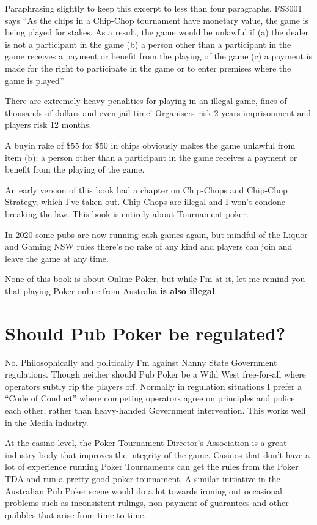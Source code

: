 Paraphrasing slightly to keep this excerpt to less than four paragraphs,
FS3001 says ``As the chips in a Chip-Chop tournament
have monetary value, the game is being played for stakes. As a result,
the game would be unlawful if (a) the dealer is not a participant in the game
(b) a person other than a participant in the game receives a payment
or benefit from the playing of the game (c) a payment is made for the
right to participate in the game or to enter premises where the game
is played''

There are extremely heavy penalities for playing in an illegal game,
fines of thousands of dollars and even jail time!
Organisers risk 2 years imprisonment and players risk 12 months.

A buyin rake of \$55 for \$50 in chips obviously
makes the game unlawful from item (b): a person other than a
participant in the game receives a payment or benefit from the playing
of the game.

An early version of this book had a chapter on Chip-Chops and
Chip-Chop Strategy, which I've taken out. Chip-Chops are illegal and I
won't condone breaking the law. This book is entirely about
Tournament poker.

In 2020 some pubs are now running cash games again, but mindful
of the Liquor and Gaming NSW rules there's no rake of any kind and
players can join and leave the game at any time.

None of this book is about Online Poker, but while I'm at it,
let me remind you that playing Poker online from Australia
\textbf{is also illegal}.

\section{Should Pub Poker be regulated?}

No. Philosophically and politically I'm against Nanny State
Government regulations. Though neither should Pub Poker
be a Wild West free-for-all where operators subtly rip the players
off. Normally in regulation situations I prefer a ``Code of Conduct''
where competing operators agree on principles and police each other,
rather than heavy-handed Government intervention. This works well
in the Media industry.

At the casino level, the Poker Tournament Director's Association is a
great industry body that improves the integrity of the game. Casinos
that don't have a lot of experience running Poker Tournaments can get
the rules from the Poker TDA and run a pretty good poker tournament. A
similar initiative in the Australian Pub Poker scene would do a lot
towards ironing out occasional problems such as inconsistent rulings,
non-payment of guarantees and other quibbles that arise from time to
time.


